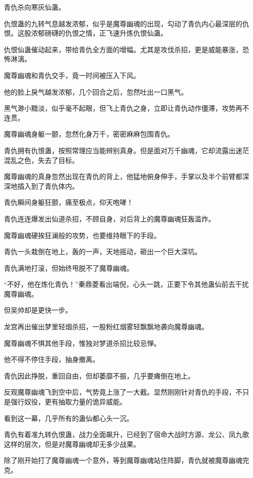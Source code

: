 \begin{this_body}
青仇杀向寒灰仙蛊。

仇恨蛊的九转气息越发浓郁，似乎是魔尊幽魂的出现，勾动了青仇内心最深层的仇恨。这股浓郁磅礴的仇恨之情，正飞速升炼仇恨仙蛊。

仇恨仙蛊催动起来，带给青仇全方面的增幅。尤其是攻伐杀招，更是威能暴涨，恐怖淋漓。

魔尊幽魂和青仇交手，竟一时间被压入下风。

他的脸上戾气越发浓郁，几个回合之后，忽然吐出一口黑气。

黑气渺小黯淡，似乎毫不起眼，但飞上青仇之身，立即让青仇动作僵滞，攻势再不连贯。

魔尊幽魂身躯一颤，忽然化身万千，密密麻麻包围青仇。

青仇拥有仇恨蛊，按照常理应当能辨别真身。但是面对万千幽魂，它却流露出迷茫混乱之色，失去了目标。

魔尊幽魂的真身忽然出现在青仇的背上，他猛地俯身伸手，手掌以及半个前臂都深深地插入到了青仇体内。

青仇瞬间身躯狂颤，痛至极点，仰天咆哮！

青仇连连爆发出仙道杀招，不顾自身，对后背上的魔尊幽魂狂轰滥炸。

魔尊幽魂硬挨狂澜般的攻势，也要维持眼下的手段。

青仇一头栽倒在地上，轰的一声，天地摇动，砸出一个巨大深坑。

青仇满地打滚，但始终甩脱不了魔尊幽魂。

“不好，他在炼化青仇！”秦鼎菱看出端倪，心头一跳，正要下令其他蛊仙前去干扰魔尊幽魂。

但吴帅却是更快一步。

龙宫再出催出梦里轻烟杀招，一股粉红烟雾轻飘飘地袭向魔尊幽魂。

魔尊幽魂不惧其他手段，惟独对梦道杀招比较忌惮。

他不得不停住手段，抽身撤离。

青仇因此挣脱，重回自由，但却萎靡不振，几乎要瘫倒在地上。

反观魔尊幽魂飞到空中后，气势竟上涨了一大截。显然刚刚针对青仇的手段，不只是强行奴役，更有抽取力量的诡异威能。

看到这一幕，几乎所有的蛊仙都心头一沉。

青仇有着准九转仇恨蛊，战力全面飙升，已经到了宿命大战时方源、龙公、凤九歌这样的层次，但是对魔尊幽魂却无多少战果。

除了刚开始打了魔尊幽魂一个意外，等到魔尊幽魂站住阵脚，青仇就被魔尊幽魂完克。


\end{this_body}
